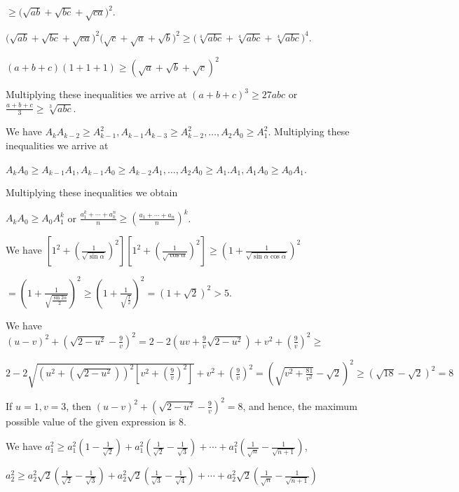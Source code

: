   $\geq \bigl(\sqrt{ab} + \sqrt{bc} + \sqrt{ca}\bigr)^2$.

  $\bigl(\sqrt{ab} + \sqrt{bc} + \sqrt{ca}\bigr)^2\bigl(\sqrt{c} + \sqrt{a}
  + \sqrt{b}\bigr)^2\geq \bigl(\sqrt[4]{abc} + \sqrt[4]{abc} + \sqrt[4]{abc}\bigr)^4$.

  $(a + b + c)(1 + 1 + 1)\geq \left(\sqrt{a} + \sqrt{b} + \sqrt{c}\right)^2$

  Multiplying these inequalities we arrive at $(a + b + c)^3\geq 27abc$ or $\frac{a + b +
    c}{3}\geq \sqrt[3]{abc}$.
\item We have $A_kA_{k - 2}\geq A_{k - 1}^2, A_{k - 1}A_{k - 3}\geq A_{k - 2}^2, \ldots, A_2A_0\geq
  A_1^2$. Multiplying these inequalities we arrive at

  $A_kA_0\geq A_{k - 1}A_1, A_{k - 1}A_0\geq A_{k - 2}A_1, \ldots, A_2A_0\geq A_1.A_1, A_1A_0\geq A_0A_1$.

  Multiplying these inequalities we obtain

  $A_kA_0\geq A_0A_1^k$ or $\frac{a_1^k + \cdots + a_k^n}{n}\geq \left(\frac{a_1 + \cdots +
    a_n}{n}\right)^k$.
\item We have $\left[1^2 + \left(\frac{1}{\sqrt{\sin \alpha}}\right)^2\right]\left[1^2
  + \left(\frac{1}{\sqrt{\cos \alpha}}\right)^2\right]\geq \left(1
  + \frac{1}{\sqrt{\sin\alpha\cos\alpha}}\right)^2$

  $= \left(1 + \frac{1}{\sqrt{\frac{\sin2\alpha}{2}}}\right)^2\geq \left(1
  + \frac{1}{\sqrt{\frac{1}{2}}}\right)^2 = (1 + \sqrt{2})^2 > 5$.
\item We have $(u - v)^2 + \left(\sqrt{2 - u^2} - \frac{9}{v}\right)^2 = 2 - 2\left(uv + \frac{9}{v}\sqrt{2
  - u^2}\right) + v^2 + \left(\frac{9}{v}\right)^2\geq$

  $2 - 2\sqrt{\left(u^2 + \left(\sqrt{2 - u^2}\right)\right)^2\left[v^2 + \left(\frac{9}{v}\right)^2\right]}
  + v^2 + \left(\frac{9}{v}\right)^2 = \left(\sqrt{v^2 + \frac{81}{v^2}}
  - \sqrt{2}\right)^2\geq \left(\sqrt{18} - \sqrt{2}\right)^2 = 8$

  If $u = 1, v = 3$, then $(u - v)^2 + \left(\sqrt{2 - u^2} - \frac{9}{v}\right)^2 = 8$, and hence, the
  maximum possible value of the given expression is $8$.
\item We have $a_1^2\geq a_1^2\left(1 - \frac{1}{\sqrt{2}}\right) +
  a_1^2\left(\frac{1}{\sqrt{2}}- \frac{1}{\sqrt{3}}\right) + \cdots + a_1^2\left(\frac{1}{\sqrt{n}}
  - \frac{1}{\sqrt{n + 1}}\right)$,

  $a_2^2\geq a_2^2\sqrt{2}\left(\frac{1}{\sqrt{2}} - \frac{1}{\sqrt{3}}\right) +
  a_2^2\sqrt{2}\left(\frac{1}{\sqrt{3}} - \frac{1}{\sqrt{4}}\right) + \cdots +
  a_2^2\sqrt{2}\left(\frac{1}{\sqrt{n}} - \frac{1}{\sqrt{n + 1}}\right)$


